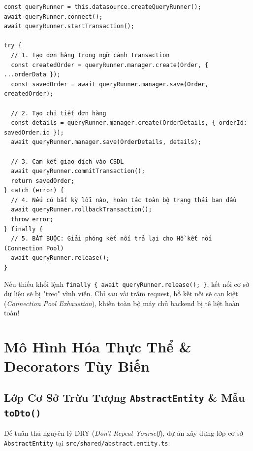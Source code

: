 \documentclass[12pt,a4paper,oneside]{book}
\begin{document}
\begin{codebox}
\begin{Verbatim}[fontsize=\small]
const queryRunner = this.datasource.createQueryRunner();
await queryRunner.connect();
await queryRunner.startTransaction();

try {
  // 1. Tạo đơn hàng trong ngữ cảnh Transaction
  const createdOrder = queryRunner.manager.create(Order, { ...orderData });
  const savedOrder = await queryRunner.manager.save(Order, createdOrder);

  // 2. Tạo chi tiết đơn hàng
  const details = queryRunner.manager.create(OrderDetails, { orderId: savedOrder.id });
  await queryRunner.manager.save(OrderDetails, details);

  // 3. Cam kết giao dịch vào CSDL
  await queryRunner.commitTransaction();
  return savedOrder;
} catch (error) {
  // 4. Nếu có bất kỳ lỗi nào, hoàn tác toàn bộ trạng thái ban đầu
  await queryRunner.rollbackTransaction();
  throw error;
} finally {
  // 5. BẮT BUỘC: Giải phóng kết nối trả lại cho Hồ kết nối (Connection Pool)
  await queryRunner.release();
}
\end{Verbatim}
\end{codebox}
Nếu thiếu khối lệnh \texttt{finally \{ await queryRunner.release(); \}}, kết nối cơ sở dữ liệu sẽ bị "treo" vĩnh viễn. Chỉ sau vài trăm request, hồ kết nối sẽ cạn kiệt (\textit{Connection Pool Exhaustion}), khiến toàn bộ máy chủ backend bị tê liệt hoàn toàn!

\chapter{Mô Hình Hóa Thực Thể \& Decorators Tùy Biến}

\section{Lớp Cơ Sở Trừu Tượng \texttt{AbstractEntity} \& Mẫu \texttt{toDto()}}
Để tuân thủ nguyên lý DRY (\textit{Don't Repeat Yourself}), dự án xây dựng lớp cơ sở \texttt{AbstractEntity} tại \texttt{src/shared/abstract.entity.ts}:
\end{document}
